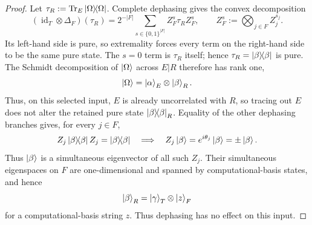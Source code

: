 \documentclass[
  aps,
  prx,
  reprint,
  superscriptaddress,
  amsmath,
  amssymb,
  nofootinbib,
  longbibliography
]{revtex4-2}
\begin{document}
\begin{proof}
Let $\tau_R:=\Tr_E\dyad{\Omega}$.  Complete dephasing gives the convex
decomposition
\begin{equation}
(\operatorname{id}_T\otimes\Delta_F)(\tau_R)
=2^{-|F|}\sum_{s\in\{0,1\}^{|F|}}Z_F^s\tau_R Z_F^s,
\qquad
Z_F^s:=\bigotimes_{j\in F}Z_j^{s_j}.
\end{equation}
Its left-hand side is pure, so extremality forces every term on the
right-hand side to be the same pure state.  The $s=0$ term is $\tau_R$
itself; hence $\tau_R=\dyad{\beta}$ is pure.  The Schmidt decomposition of
$\ket{\Omega}$ across $E|R$ therefore has rank one,
\begin{equation}
\ket{\Omega}=\ket{\alpha}_E\otimes\ket{\beta}_R.
\label{eq:supp-discarded-retained-factorization}
\end{equation}
Thus, on this selected input, $E$ is already uncorrelated with $R$, so tracing
out $E$ does not alter the retained pure state $\dyad{\beta}_R$.
Equality of the other dephasing branches gives, for every $j\in F$,
\begin{equation}
Z_j\dyad{\beta}Z_j=\dyad{\beta}
\quad\Longrightarrow\quad
Z_j\ket{\beta}=e^{i\theta_j}\ket{\beta}=\pm\ket{\beta}.
\end{equation}
Thus $\ket{\beta}$ is a simultaneous eigenvector of all such $Z_j$.  Their
simultaneous eigenspaces on $F$ are one-dimensional and spanned by
computational-basis states, and hence
\begin{equation}
\ket{\beta}_R=\ket{\gamma}_T\otimes\ket{z}_F
\label{eq:supp-retained-dephased-factorization}
\end{equation}
for a computational-basis string $z$.  Thus dephasing has no effect on this
input.


\end{proof}
\end{document}
